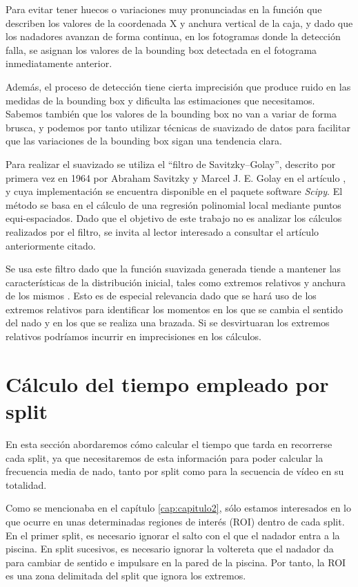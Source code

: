 Para evitar tener huecos o variaciones muy pronunciadas en la función que describen los valores de la coordenada X y anchura vertical de la caja, y dado que los nadadores avanzan de forma continua, en los fotogramas donde la detección falla, se asignan los valores de la bounding box detectada en el fotograma inmediatamente anterior.

Además, el proceso de detección tiene cierta imprecisión que produce ruido en las medidas de la bounding box y dificulta las estimaciones que necesitamos. Sabemos también que los valores de la bounding box no van a variar de forma brusca, y podemos por tanto utilizar técnicas de suavizado de datos para facilitar que las variaciones de la bounding box sigan una tendencia clara. 

Para realizar el suavizado se utiliza el ``filtro de Savitzky–Golay'', descrito por primera vez en 1964 por Abraham Savitzky y Marcel J. E. Golay en el artículo \cite{filtrosavgol}, y cuya implementación se encuentra disponible en el paquete software \textit{Scipy}. El método se basa en el cálculo de una regresión polinomial local mediante puntos equi-espaciados. Dado que el objetivo de este trabajo no es analizar los cálculos realizados por el filtro, se invita al lector interesado a consultar el artículo anteriormente citado.

Se usa este filtro dado que la función suavizada generada tiende a mantener las características de la distribución inicial, tales como extremos relativos y anchura de los mismos \cite{filtrosavgol}. Esto es de especial relevancia dado que se hará uso de los extremos relativos para identificar los momentos en los que se cambia el sentido del nado y en los que se realiza una brazada. Si se desvirtuaran los extremos relativos podríamos incurrir en imprecisiones en los cálculos.

\section{Cálculo del tiempo empleado por split} \label{calculotiemposplit} 

En esta sección abordaremos cómo calcular el tiempo que tarda en recorrerse cada split, ya que necesitaremos de esta información para poder calcular la frecuencia media de nado, tanto por split como para la secuencia de vídeo en su totalidad. 

Como se mencionaba en el capítulo \ref{cap:capitulo2}, sólo estamos interesados en lo que ocurre en unas determinadas regiones de interés (ROI) dentro de cada split. En el primer split, es necesario ignorar el salto con el que el nadador entra a la piscina. En split sucesivos, es necesario ignorar la voltereta que el nadador da para cambiar de sentido e impulsare en la pared de la piscina. Por tanto, la ROI es una zona delimitada del split que ignora los extremos. 

